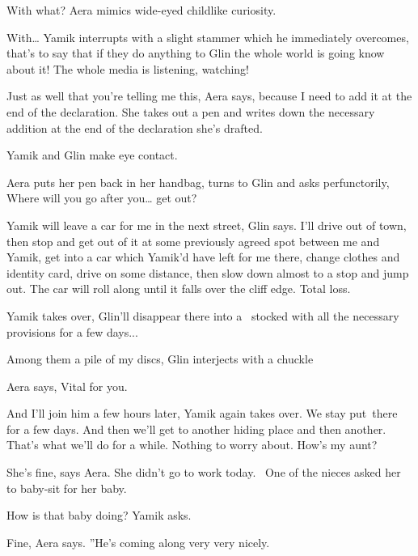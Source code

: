 \documentclass[12pt]{book}
\begin{document}
{\textquotedbl}With what?{\textquotedbl} Aera mimics wide-eyed childlike curiosity.

{\textquotedbl}With{\dots}{\textquotedbl} Yamik interrupts with a slight stammer which he immediately overcomes,
{\textquotedbl}that's to say that if they do anything to Glin the whole world is going know about it! The whole media
is listening, watching!{\textquotedbl}

{\textquotedbl}Just as well that you're telling me this,{\textquotedbl} Aera says, {\textquotedbl}because I need to add
it at the end of the declaration.{\textquotedbl} She takes out a pen and writes down the necessary addition at the end
of the declaration she's drafted.

Yamik and Glin make eye contact.

Aera puts her pen back in her handbag, turns to Glin and asks perfunctorily, {\textquotedbl}Where will you go after
you{\dots} get out?{\textquotedbl}

{\textquotedbl}Yamik will leave a car for me in the next street,{\textquotedbl} Glin says. {\textquotedbl}I'll drive out
of town, then stop and get out of it at some previously agreed spot between me and Yamik, get into a car which Yamik'd
have left for me there, change clothes and identity card, drive on some distance, then slow down almost to a stop and
jump out. The car will roll along until it falls over the cliff edge. Total loss.{\textquotedbl}

Yamik takes over, {\textquotedbl}Glin'll disappear there into a \ stocked with all the necessary provisions for a few
days...{\textquotedbl}

{\textquotedbl}Among them a pile of my discs,{\textquotedbl} Glin interjects with a chuckle

Aera says, {\textquotedbl}Vital for you.{\textquotedbl}

{\textquotedbl}And I'll join him a few hours later,{\textquotedbl} Yamik again takes over. {\textquotedbl}We stay
put~there for a few days. And then we'll get to another hiding place and then another. That's what we'll do for a
while. Nothing to worry about. How's my aunt?{\textquotedbl}

{\textquotedbl}She's fine,{\textquotedbl} says Aera. {\textquotedbl}She didn't go to work today.~ One of the nieces
asked her to baby-sit for her baby.{\textquotedbl}

{\textquotedbl}How is that baby doing?{\textquotedbl} Yamik asks.

{\textquotedbl}Fine,{\textquotedbl} Aera says. ''He's coming along very very nicely.{\textquotedbl}
\end{document}
